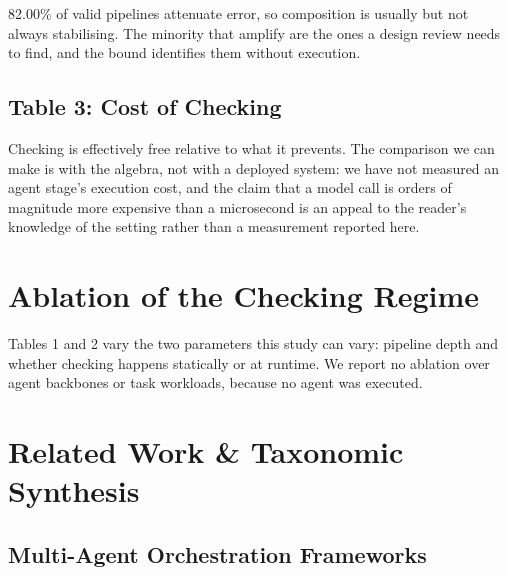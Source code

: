 \documentclass[10pt,journal,compsoc,twocolumn]{IEEEtran}
\begin{document}
82.00\% of valid pipelines attenuate error, so composition is usually but not always stabilising. The minority that amplify are the ones a design review needs to find, and the bound identifies them without execution.


\subsection{Table 3: Cost of Checking}
\begin{table}[htbp]
\centering
{}
\end{table}

Checking is effectively free relative to what it prevents. The comparison we can make is with the algebra, not with a deployed system: we have not measured an agent stage's execution cost, and the claim that a model call is orders of magnitude more expensive than a microsecond is an appeal to the reader's knowledge of the setting rather than a measurement reported here.



\section{Ablation of the Checking Regime}


Tables 1 and 2 vary the two parameters this study can vary: pipeline depth and whether checking happens statically or at runtime. We report no ablation over agent backbones or task workloads, because no agent was executed.




\section{Related Work \& Taxonomic Synthesis}



\subsection{Multi-Agent Orchestration Frameworks}
\end{document}
